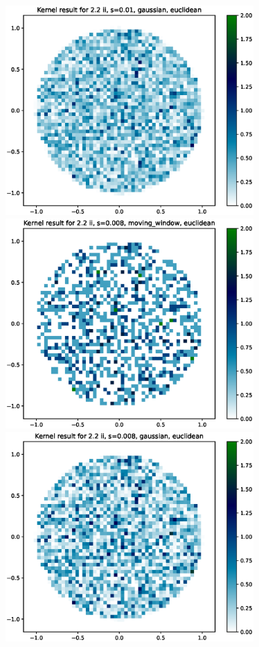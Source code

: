 \documentclass{article}
\begin{document}
\includegraphics[height=8cm]{comparisons//Kernel_result_2-2ii_s_0-01_gaussian_euclidean.eps}  \\
\hspace*{-1.5cm}\includegraphics[height=8cm]{comparisons//Kernel_result_2-2ii_s_0-008_moving_window_euclidean.eps} \hspace*{-1.5cm}
\includegraphics[height=8cm]{comparisons//Kernel_result_2-2ii_s_0-008_gaussian_euclidean.eps}  \\
\end{document}
